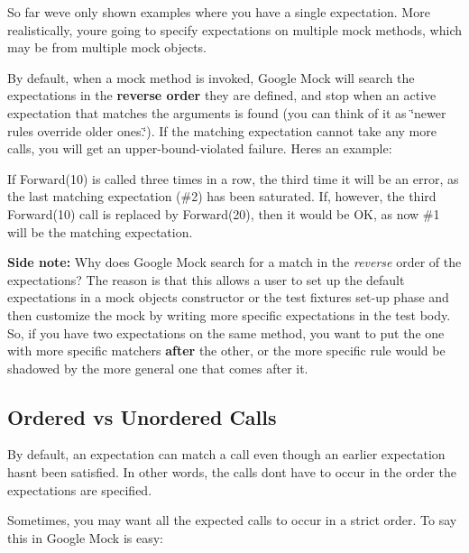 So far we\textquotesingle{}ve only shown examples where you have a single expectation. More realistically, you\textquotesingle{}re going to specify expectations on multiple mock methods, which may be from multiple mock objects.

By default, when a mock method is invoked, Google Mock will search the expectations in the {\bfseries reverse order} they are defined, and stop when an active expectation that matches the arguments is found (you can think of it as \char`\"{}newer rules override older ones.\char`\"{}). If the matching expectation cannot take any more calls, you will get an upper-\/bound-\/violated failure. Here\textquotesingle{}s an example\+:




If {\ttfamily Forward(10)} is called three times in a row, the third time it will be an error, as the last matching expectation (\#2) has been saturated. If, however, the third {\ttfamily Forward(10)} call is replaced by {\ttfamily Forward(20)}, then it would be OK, as now \#1 will be the matching expectation.

{\bfseries Side note\+:} Why does Google Mock search for a match in the {\itshape reverse} order of the expectations? The reason is that this allows a user to set up the default expectations in a mock object\textquotesingle{}s constructor or the test fixture\textquotesingle{}s set-\/up phase and then customize the mock by writing more specific expectations in the test body. So, if you have two expectations on the same method, you want to put the one with more specific matchers {\bfseries after} the other, or the more specific rule would be shadowed by the more general one that comes after it.

\subsection*{Ordered vs Unordered Calls}

By default, an expectation can match a call even though an earlier expectation hasn\textquotesingle{}t been satisfied. In other words, the calls don\textquotesingle{}t have to occur in the order the expectations are specified.

Sometimes, you may want all the expected calls to occur in a strict order. To say this in Google Mock is easy\+:


